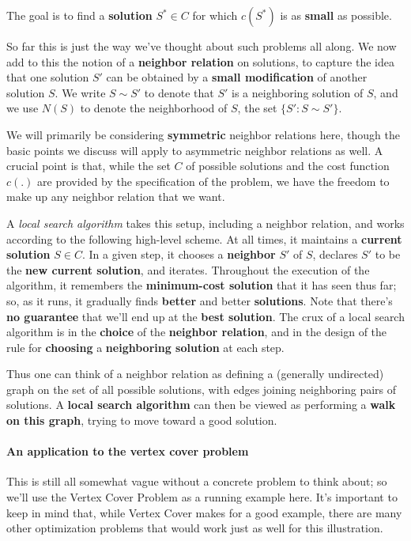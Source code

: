 The goal is to find a \textbf{solution} $S^* \in C$ for which $c(S^*)$ is as \textbf{small} as possible. 

So far this is just the way we’ve thought about such problems all along. We now add to this the notion of a \textbf{neighbor relation} on solutions, to capture the idea that one solution $S'$ can be obtained by a \textbf{small modification} of another solution $S$. We write $S \sim S'$ to denote that $S'$ is a neighboring solution of $S$, and we use $N(S)$ to denote the neighborhood of $S$, the set $\{ S' : S \sim S' \}$. 

We will primarily be considering \textbf{symmetric} neighbor relations here, though the basic points we discuss will apply to asymmetric neighbor relations as well. A crucial point is that, while the set $C$ of possible solutions and the cost function $c(.)$ are provided by the specification of the problem, we have the freedom to make up any neighbor relation that we want. 

A \textit{local search algorithm} takes this setup, including a neighbor relation, and works according to the following high-level scheme. At all times, it maintains a \textbf{current solution} $S \in C$. In a given step, it chooses a \textbf{neighbor} $S'$ of $S$, declares $S'$ to be the \textbf{new current solution}, and iterates. Throughout the execution of the algorithm, it remembers the \textbf{minimum-cost solution} that it has seen thus far; so, as it runs, it gradually finds \textbf{better} and better \textbf{solutions}. Note that there's \textbf{no guarantee} that we'll end up at the \textbf{best solution}. The crux of a local search algorithm is in the \textbf{choice} of the \textbf{neighbor relation}, and in the design of the rule for \textbf{choosing} a \textbf{neighboring solution} at each step. 

Thus one can think of a neighbor relation as defining a (generally undirected) graph on the set of all possible solutions, with edges joining neighboring pairs of solutions. A \textbf{local search algorithm} can then be viewed as performing a \textbf{walk on this graph}, trying to move toward a good solution.

\paragraph{An application to the vertex cover problem}
This is still all somewhat vague without a concrete problem to think about; so we’ll use the Vertex Cover Problem as a running example here. It’s important to keep in mind that, while Vertex Cover makes for a good example, there are many other optimization problems that would work just as well for this illustration. 


